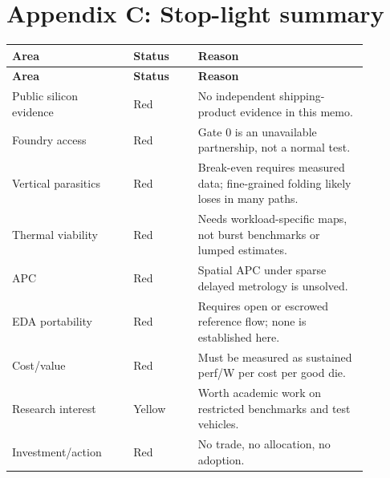 \documentclass[11pt]{article}
\begin{document}
\section*{Appendix C: Stop-light summary}
\begin{longtable}{p{0.30\linewidth}p{0.16\linewidth}p{0.42\linewidth}}
\toprule
\textbf{Area} & \textbf{Status} & \textbf{Reason}\\
\midrule
\endfirsthead
\toprule
\textbf{Area} & \textbf{Status} & \textbf{Reason}\\
\midrule
\endhead
Public silicon evidence & Red & No independent shipping-product evidence in this memo.\\
Foundry access & Red & Gate 0 is an unavailable partnership, not a normal test.\\
Vertical parasitics & Red & Break-even requires measured data; fine-grained folding likely loses in many paths.\\
Thermal viability & Red & Needs workload-specific maps, not burst benchmarks or lumped estimates.\\
APC & Red & Spatial APC under sparse delayed metrology is unsolved.\\
EDA portability & Red & Requires open or escrowed reference flow; none is established here.\\
Cost/value & Red & Must be measured as sustained perf/W per cost per good die.\\
Research interest & Yellow & Worth academic work on restricted benchmarks and test vehicles.\\
Investment/action & Red & No trade, no allocation, no adoption.\\
\bottomrule
\end{longtable}
\end{document}

